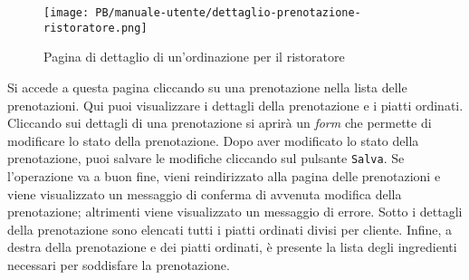 \begin{figure}[htbp]
    \centering
	\texttt{[image: PB/manuale-utente/dettaglio-prenotazione-ristoratore.png]}
    \caption{Pagina di dettaglio di un'ordinazione per il ristoratore}
\end{figure}

Si accede a questa pagina cliccando su una prenotazione nella lista delle
prenotazioni. Qui puoi visualizzare i dettagli della prenotazione e i piatti
ordinati. Cliccando sui dettagli di una prenotazione si aprirà un \textit{form} che
permette di modificare lo stato della prenotazione. Dopo aver modificato lo
stato della prenotazione, puoi salvare le modifiche cliccando sul pulsante
\texttt{Salva}. Se l'operazione va a buon fine, vieni reindirizzato alla pagina
delle prenotazioni e viene visualizzato un messaggio di conferma di avvenuta
modifica della prenotazione; altrimenti viene visualizzato un messaggio di errore.
Sotto i dettagli della prenotazione sono elencati tutti i piatti ordinati divisi
per cliente. Infine, a destra della prenotazione e dei piatti ordinati, è
presente la lista degli ingredienti necessari per soddisfare la prenotazione.
